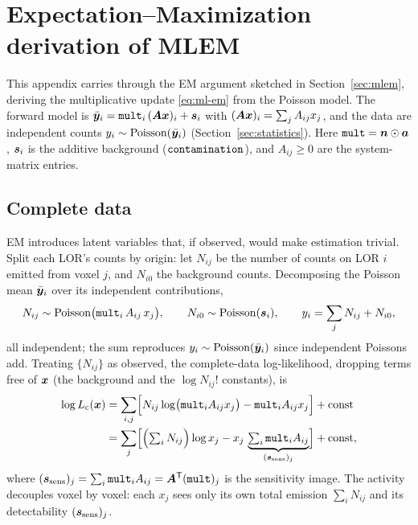 \section{Expectation--Maximization derivation of MLEM}
\label{app:em}

This appendix carries through the EM argument sketched in
Section~\ref{sec:mlem}, deriving the multiplicative update \eqref{eq:ml-em} from
the Poisson model. The forward model is $\bar{\bm{y}}_i = \texttt{mult}_i\,(\bm{A}\bm{x})_i +
\bm{s}_i$ with $(\bm{A}\bm{x})_i=\sum_j A_{ij}x_j$, and the data are independent counts
$y_i\sim\mathrm{Poisson}(\bar{\bm{y}}_i)$ (Section~\ref{sec:statistics}). Here
$\texttt{mult}=\bm{n}\odot\bm{a}$, $\bm{s}_i$ is the additive background
($\texttt{contamination}$), and $A_{ij}\ge0$ are the system-matrix entries.

\subsection*{Complete data}

EM introduces latent variables that, if observed, would make estimation trivial.
Split each LOR's counts by origin: let $N_{ij}$ be the number of counts on LOR
$i$ emitted from voxel $j$, and $N_{i0}$ the background counts. Decomposing the
Poisson mean $\bar{\bm{y}}_i$ over its independent contributions,
\begin{equation}
  N_{ij}\sim\mathrm{Poisson}\bigl(\texttt{mult}_i\,A_{ij}\,x_j\bigr),
  \qquad
  N_{i0}\sim\mathrm{Poisson}(\bm{s}_i),
  \qquad
  y_i = \sum_j N_{ij} + N_{i0},
  \label{eq:app-em-latent}
\end{equation}
all independent; the sum reproduces $y_i\sim\mathrm{Poisson}(\bar{\bm{y}}_i)$ since
independent Poissons add. Treating $\{N_{ij}\}$ as observed, the complete-data
log-likelihood, dropping terms free of $\bm{x}$ (the background and the
$\log N_{ij}!$ constants), is
\begin{align}
  \log L_{\mathrm c}(\bm{x})
  &= \sum_{i,j}\Bigl[N_{ij}\log\bigl(\texttt{mult}_i A_{ij} x_j\bigr)
        - \texttt{mult}_i A_{ij} x_j\Bigr] + \text{const} \notag\\
  &= \sum_j\Bigl[\Bigl(\textstyle\sum_i N_{ij}\Bigr)\log x_j
        - x_j\,\underbrace{\textstyle\sum_i \texttt{mult}_i A_{ij}}_{(\bm{s}_{\mathrm{sens}})_j}\Bigr]
        + \text{const},
  \label{eq:app-em-complete}
\end{align}
where $(\bm{s}_{\mathrm{sens}})_j=\sum_i \texttt{mult}_i A_{ij}=\bm{A}^{\mathsf{T}}(\texttt{mult})_j$ is the
sensitivity image. The activity decouples voxel by voxel: each $x_j$ sees only its
own total emission $\sum_i N_{ij}$ and its detectability $(\bm{s}_{\mathrm{sens}})_j$.

